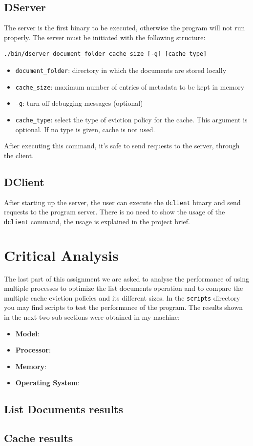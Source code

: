 \documentclass[a4paper, 11pt]{article}
\begin{document}
\subsection{DServer}

The server is the first binary to be executed, otherwise the program will not run properly. The server must be initiated with the following structure:

\begin{verbatim}
./bin/dserver document_folder cache_size [-g] [cache_type]
\end{verbatim}

\begin{itemize}
    \item \texttt{document\_folder}: directory in which the documents are stored locally
    \item \texttt{cache\_size}: maximum number of entries of metadata to be kept in memory
    \item \texttt{-g}: turn off debugging messages (optional)
    \item \texttt{cache\_type}: select the type of eviction policy for the cache. This argument is optional. If no type is given, cache is not used.
\end{itemize}

\noindent After executing this command, it's safe to send requests to the server, through the client.


\subsection{DClient}

After starting up the server, the user can execute the \texttt{dclient} binary and send requests to the program server. There is no need to show the usage of the \texttt{dclient} command, the usage is explained in the project brief.


\section{Critical Analysis}

The last part of this assignment we are asked to analyse the performance of using multiple processes to optimize the list documents operation and to compare the multiple cache eviction policies and its different sizes. In the \texttt{scripts} directory you may find scripts to test the performance of the program. The results shown in the next two sub sections were obtained in my machine:

\begin{itemize}
    \item \textbf{Model}:
    \item \textbf{Processor}:
    \item \textbf{Memory}:
    \item \textbf{Operating System}:
\end{itemize}

\subsection{List Documents results}


\subsection{Cache results}
\end{document}
